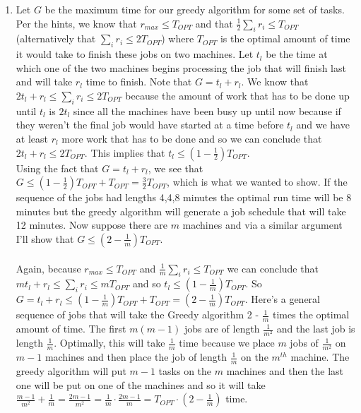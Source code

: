 \documentclass{article}
\begin{document}
\begin{enumerate}
	\item Let $G$ be the maximum time for our greedy algorithm for some set of tasks. Per the hints, we know that $r_{max} \leq T_{OPT}$ and that $\frac{1}{2}\sum_i r_i \leq T_{OPT}$ (alternatively that $\sum_i r_i \leq 2T_{OPT}$) where $T_{OPT}$ is the optimal amount of time it would take to finish these jobs on two machines.  Let $t_l$ be the time at which one of the two machines begins processing the job that will finish last and will take $r_l$ time to finish. Note that $G = t_l + r_l$.  We know that $2t_l + r_l \leq \sum_i r_i \leq 2T_{OPT}$ because the amount of work that has to be done up until $t_l$ is $2t_l$ since all the machines have been busy up until now because if they weren't the final job would have started at a time before $t_l$ and we have at least $r_l$ more work that has to be done and so we can conclude that $2t_l + r_l \leq 2T_{OPT}$.  This implies that $t_l \leq (1 - \frac{1}{2})T_{OPT}$. \\
	Using the fact that $G = t_l + r_l$, we see that $G \leq (1 - \frac{1}{2})T_{OPT} + T_{OPT} = \frac{3}{2}T_{OPT}$, which is what we wanted to show. If the sequence of the jobs had lengths 4,4,8 minutes the optimal run time will be 8 minutes but the greedy algorithm will generate a job schedule that will take 12 minutes.  
	Now suppose there are $m$ machines and via a similar argument I'll show that $G \leq (2 - \frac{1}{m})T_{OPT}$.  \\\\
	Again, because $r_{max} \leq T_{OPT}$ and $\frac{1}{m}\sum_i r_i \leq T_{OPT}$ we can conclude that $mt_l + r_l \leq \sum_i r_i \leq mT_{OPT}$ and so $t_l \leq (1 - \frac{1}{m})T_{OPT}$.  So $G = t_l + r_l \leq (1 - \frac{1}{m})T_{OPT} + T_{OPT} = (2 - 
	\frac{1}{m})T_{OPT}$.  Here's a general sequence of jobs that will take the Greedy algorithm 2 - $\frac{1}{m}$ times the optimal amount of time.  The first $m(m-1)$ jobs are of length $\frac{1}{m^2}$ and the last job is length $\frac{1}{m}$.  Optimally, this will take $\frac{1}{m}$ time because we place $m$ jobs of $\frac{1}{m^2}$ on $m-1$ machines and then place the job of length $\frac{1}{m}$ on the $m^{th}$ machine.  The greedy algorithm will put $m-1$ tasks on the $m$ machines and then the last one will be put on one of the machines and so it will take $\frac{m-1}{m^2} + \frac{1}{m} = \frac{2m-1}{m^2} = \frac{1}{m}\cdot\frac{2m-1}{m} = T_{OPT}\cdot(2 - \frac{1}{m})$ time.  
	

\end{enumerate}
\end{document}
